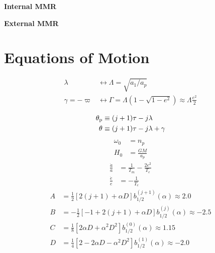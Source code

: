 \documentclass[12pt]{extarticle}
\begin{document}
\begin{minipage}[t]{0.5\linewidth}
  \begin{center}
    \textbf{\Large Internal MMR}\\
  \end{center}
\end{minipage}
\begin{minipage}[t]{0.5\linewidth}
  \begin{center}
    \textbf{\Large External MMR}\\
  \end{center}
\end{minipage}

  \section*{Equations of Motion}
\begin{minipage}[t]{0.5\linewidth}
  \begin{align*}
    \lambda &\longleftrightarrow \Lambda = \sqrt{a_1/a_p} \\
    \gamma=-\varpi &\longleftrightarrow \Gamma =\Lambda(1-\sqrt{1-e^2})\approx \Lambda \frac{e^2}{2} \\
    \end{align*}
    \begin{align*}
      \theta_{\rm p} & \equiv(j+1)\tau - j\lambda \\
      \theta_{\rm} &\equiv(j+1)\tau - j\lambda + \gamma
  \end{align*}
  \begin{align*}
   \omega_0 &= n_p  \\
    H_0 &= \frac{GM}{a_p} 
  \end{align*}
  \begin{align*}
    \frac{\dot{a}}{a} &= \frac{1}{T_m} - \frac{2e^2}{T_e}\\
    \frac{\dot{e}}{e} &= - \frac{1}{T_e}
  \end{align*}
  \begin{align*}
    A &=  \frac12[2(j+1)+\alpha D]b_{1/2}^{(j+1)}(\alpha) \approx 2.0 \\
    B &= -\frac12[-1+2(j+1)+\alpha D]b_{1/2}^{(j)}(\alpha) \approx -2.5\\
    C &= \frac18[2\alpha D + \alpha^2 D^2]b_{1/2}^{(0)}(\alpha) \approx 1.15\\
    D &= \frac14[2-2\alpha D - \alpha^2 D^2]b_{1/2}^{(1)}(\alpha)\approx -2.0 
  \end{align*}
\end{minipage}
\end{document}
